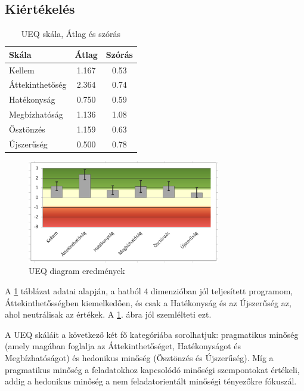 \subsection{Kiértékelés}
\begin{table}[h]
    \centering
    \caption{UEQ skála, Átlag és szórás}
    \begin{tabular}{|l|c|c|}
        \hline
        \textbf{Skála} & \textbf{Átlag} & \textbf{Szórás} \\ \hline
        Kellem & 1.167 & 0.53 \\ \hline
        Áttekinthetőség & 2.364 & 0.74 \\ \hline
        Hatékonyság & 0.750 & 0.59 \\ \hline
        Megbízhatóság & 1.136 & 1.08 \\ \hline
        Ösztönzés & 1.159 & 0.63 \\ \hline
        Újszerűség & 0.500 & 0.78 \\ \hline
    \end{tabular}
    \label{tab:ueq_scales}
\end{table}

\begin{figure}[h]
    \center
    \includegraphics[width=0.75\textwidth]{img/UEQ_diagram.png}
    \caption{UEQ diagram eredmények}
    \label{diag:ueq}
\end{figure}

A \ref{tab:ueq_scales} táblázat adatai alapján, a hatból 4 dimenzióban jól teljesített  programom, Áttekinthetősségben kiemelkedően, és csak a Hatékonyság és az Újszerűség az, ahol neutrálisak az értékek. A \ref{diag:ueq}. ábra jól szemlélteti ezt. 


A UEQ skáláit a következő két fő kategóriába sorolhatjuk: pragmatikus minőség (amely magában foglalja az Áttekinthetőséget, Hatékonyságot és Megbízhatóságot) és hedonikus minőség (Ösztönzés és Újszerűség). 
Míg a pragmatikus minőség a feladatokhoz kapcsolódó minőségi szempontokat értékeli, addig a hedonikus minőség a nem feladatorientált minőségi tényezőkre fókuszál.

